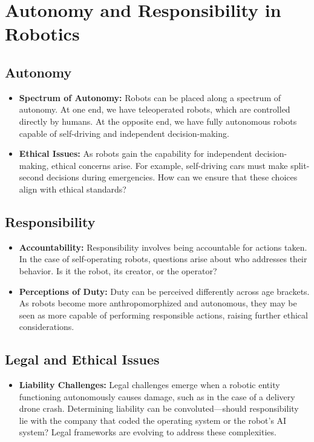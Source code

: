 \section{Autonomy and Responsibility in Robotics}

\subsection{Autonomy}
\begin{itemize}
    \item \textbf{Spectrum of Autonomy:} Robots can be placed along a spectrum of autonomy. At one end, we have teleoperated robots, which are controlled directly by humans. At the opposite end, we have fully autonomous robots capable of self-driving and independent decision-making.
    
    \item \textbf{Ethical Issues:} As robots gain the capability for independent decision-making, ethical concerns arise. For example, self-driving cars must make split-second decisions during emergencies. How can we ensure that these choices align with ethical standards?
\end{itemize}

\subsection{Responsibility}
\begin{itemize}
    \item \textbf{Accountability:} Responsibility involves being accountable for actions taken. In the case of self-operating robots, questions arise about who addresses their behavior. Is it the robot, its creator, or the operator?
    
    \item \textbf{Perceptions of Duty:} Duty can be perceived differently across age brackets. As robots become more anthropomorphized and autonomous, they may be seen as more capable of performing responsible actions, raising further ethical considerations.
\end{itemize}

\subsection{Legal and Ethical Issues}
\begin{itemize}
    \item \textbf{Liability Challenges:} Legal challenges emerge when a robotic entity functioning autonomously causes damage, such as in the case of a delivery drone crash. Determining liability can be convoluted—should responsibility lie with the company that coded the operating system or the robot’s AI system? Legal frameworks are evolving to address these complexities.
\end{itemize}

